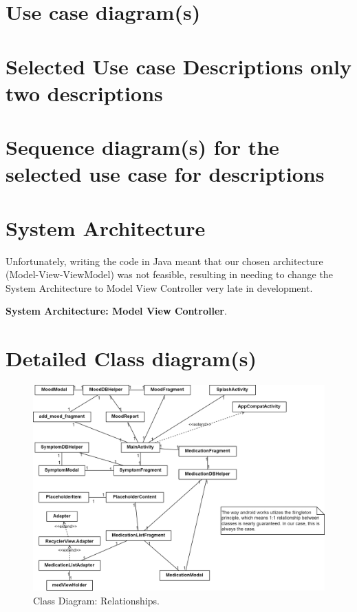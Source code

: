 \documentclass[11pt]{article}
\begin{document}
    \section{Use case diagram(s)}\label{sec:use-case-diagram(s)}


    \section{Selected Use case Descriptions {only two descriptions}}\label{sec:selected-use-case-descriptions}


    \section{Sequence diagram(s) {for the selected use case for descriptions}}\label{sec:sequence-diagram(s)}


    \section{System Architecture}\label{sec:system-architecture}

    Unfortunately, writing the code in Java meant that our chosen architecture (Model-View-ViewModel) was not feasible, resulting in needing to change the System Architecture to Model View Controller very late in development.

    \textbf{System Architecture: Model View Controller}.


    \section{Detailed Class diagram(s)}\label{sec:detailed-class-diagram(s)}

    \begin{figure}[H]
        \centering
        \includegraphics[width=\textwidth]{Diagrams/Class Diagrams/Class Diagram-Class Relationships (No Method)}
        \caption{Class Diagram: Relationships.}
        \label{fig:figure}
    \end{figure}
\end{document}
